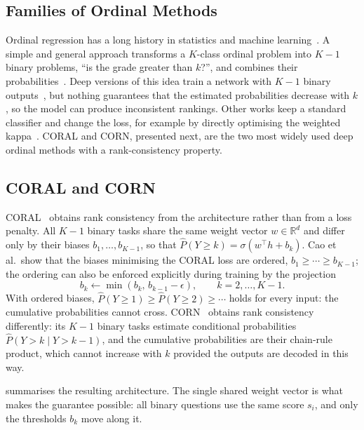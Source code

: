 \subsection{Families of Ordinal Methods}

Ordinal regression has a long history in statistics and machine
learning~\cite{gutierrez2016ordinal}. A simple and general approach transforms a
$K$-class ordinal problem into $K-1$ binary problems, ``is the grade greater than $k$?'',
and combines their probabilities~\cite{frank2001ordinal}. Deep versions of this idea train
a network with $K-1$ binary outputs~\cite{niu2016ordinal}, but nothing guarantees that the
estimated probabilities decrease with $k$, so the model can produce inconsistent rankings.
Other works keep a standard classifier and change the loss, for example by directly
optimising the weighted kappa~\cite{delatorre2018kappa}. CORAL and CORN, presented next,
are the two most widely used deep ordinal methods with a rank-consistency property.

\subsection{CORAL and CORN}

CORAL~\cite{cao2020coral} obtains rank consistency from the architecture rather than from
a loss penalty. All $K-1$ binary tasks share the same weight vector $w\in\mathbb{R}^d$ and
differ only by their biases $b_1,\ldots,b_{K-1}$, so that
$\hat P(Y\geq k)=\sigma(w^{\top}h+b_k)$. Cao et al.\ show that the biases minimising the
CORAL loss are ordered, $b_1\geq\cdots\geq b_{K-1}$; the ordering can also be enforced
explicitly during training by the projection
\begin{equation}
b_k \leftarrow \min(b_k,\, b_{k-1} - \epsilon), \qquad k=2,\ldots,K-1 .
\label{eq:coral-proj}
\end{equation}
With ordered biases, $\hat P(Y\geq 1)\geq \hat P(Y\geq 2)\geq\cdots$ holds for every input:
the cumulative probabilities cannot cross. CORN~\cite{shi2023corn} obtains rank
consistency differently: its $K-1$ binary tasks estimate conditional probabilities
$\hat P(Y>k\mid Y>k-1)$, and the cumulative probabilities are their chain-rule product,
which cannot increase with $k$ provided the outputs are decoded in this way.

 summarises the resulting architecture. The single shared weight vector
is what makes the guarantee possible: all binary questions use the same score $s_i$, and
only the thresholds $b_k$ move along it.

